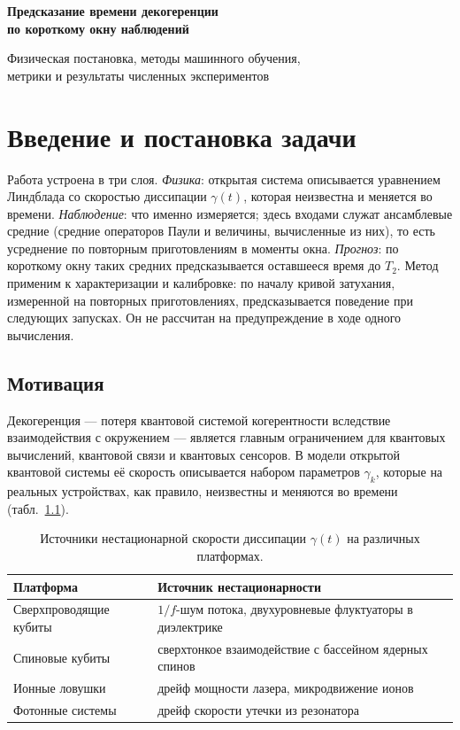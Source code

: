 \documentclass[12pt,a4paper]{report}
\numberwithin{equation}{chapter}
\begin{document}
\begin{titlepage}
\centering
\vspace*{4cm}
{\LARGE\bfseries Предсказание времени декогеренции\\[6pt]
по короткому окну наблюдений\par}
\vspace{1.2cm}
{\large Физическая постановка, методы машинного обучения,\\
метрики и результаты численных экспериментов\par}
\vfill
\end{titlepage}

\tableofcontents
\clearpage

\chapter{Введение и постановка задачи}
\label{chap:intro}

Работа устроена в три слоя. \emph{Физика}: открытая система описывается
уравнением Линдблада со скоростью диссипации $\gamma(t)$, которая неизвестна
и меняется во времени. \emph{Наблюдение}: что именно измеряется; здесь
входами служат ансамблевые средние (средние операторов Паули и величины,
вычисленные из них), то есть усреднение по повторным приготовлениям
в моменты окна. \emph{Прогноз}: по короткому окну таких средних предсказывается
оставшееся время до $T_2$. Метод применим к характеризации и калибровке:
по началу кривой затухания, измеренной на повторных приготовлениях,
предсказывается поведение при следующих запусках. Он не рассчитан на
предупреждение в ходе одного вычисления.

\section{Мотивация}

Декогеренция --- потеря квантовой системой когерентности вследствие
взаимодействия с окружением --- является главным ограничением для квантовых
вычислений, квантовой связи и квантовых сенсоров. В модели открытой
квантовой системы её скорость описывается набором параметров $\gamma_k$,
которые на реальных устройствах, как правило, неизвестны и меняются во времени
(табл.~\ref{tab:platforms}).

\begin{table}[h]
\centering
\caption{Источники нестационарной скорости диссипации $\gamma(t)$ на
различных платформах.}
\label{tab:platforms}
\small
\begin{tabular}{@{}ll@{}}
\toprule
Платформа & Источник нестационарности \\
\midrule
Сверхпроводящие кубиты & $1/f$-шум потока, двухуровневые флуктуаторы в диэлектрике \\
Спиновые кубиты & сверхтонкое взаимодействие с бассейном ядерных спинов \\
Ионные ловушки & дрейф мощности лазера, микродвижение ионов \\
Фотонные системы & дрейф скорости утечки из резонатора \\
\bottomrule
\end{tabular}
\end{table}
\end{document}
